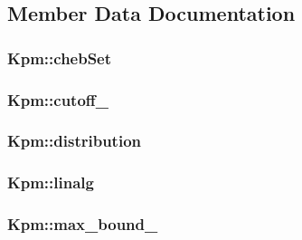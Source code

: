 \subsection{Member Data Documentation}
\hypertarget{classKpm_a0386ba4d55d9d49365ca0c180b802674}{
\subsubsection[{cheb\+Set}]{ Kpm\+::cheb\+Set\hspace{0.3cm}{\ttfamily [private]}}}\label{classKpm_a0386ba4d55d9d49365ca0c180b802674}
\hypertarget{classKpm_abc651c7281a9b6d2ed5b1c0796e3f62b}{
\subsubsection[{cutoff\+\_\+}]{ Kpm\+::cutoff\+\_\+\hspace{0.3cm}{\ttfamily [private]}}}\label{classKpm_abc651c7281a9b6d2ed5b1c0796e3f62b}
\hypertarget{classKpm_ad729944f0ddd8d19e93071980fe4c3e7}{
\subsubsection[{distribution}]{ Kpm\+::distribution\hspace{0.3cm}{\ttfamily [private]}}}\label{classKpm_ad729944f0ddd8d19e93071980fe4c3e7}
\hypertarget{classKpm_af0a93d02c795e789be2aeeb2e268fa79}{
\subsubsection[{linalg}]{ Kpm\+::linalg\hspace{0.3cm}{\ttfamily [private]}}}\label{classKpm_af0a93d02c795e789be2aeeb2e268fa79}
\hypertarget{classKpm_a6d5c5171fb621c644228c8929beabd24}{
\subsubsection[{max\+\_\+bound\+\_\+}]{ Kpm\+::max\+\_\+bound\+\_\+\hspace{0.3cm}{\ttfamily [private]}}}\label{classKpm_a6d5c5171fb621c644228c8929beabd24}
